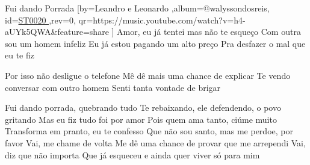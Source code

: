 \beginsong
{Fui dando Porrada %
}[by={Leandro e Leonardo %
},album={@walyssondosreis},
id={\href{https://music.youtube.com/watch?v=h4-aUYk5QWA&feature=share %
}{ST0020 %
}},rev={0}, %
qr={https://music.youtube.com/watch?v=h4-aUYk5QWA&feature=share %
}]
\beginverse 
Amor, eu já tentei mas não te esqueço
Com outra sou um homem infeliz
Eu já estou pagando um alto preço
Pra desfazer o mal que eu te fiz
\endverse

\beginverse 
Por isso não desligue o telefone
Mê dê mais uma chance de explicar
Te vendo conversar com outro homem
Senti tanta vontade de brigar
\endverse

\beginchorus
Fui dando porrada, quebrando tudo
Te rebaixando, ele defendendo, o povo gritando
Mas eu fiz tudo foi por amor
Pois quem ama tanto, ciúme muito
Transforma em pranto, eu te confesso
Que não sou santo, mas me perdoe, por favor
Vai, me chame de volta
Me dê uma chance de provar que me arrependi
Vai, diz que não importa
Que já esqueceu e ainda quer viver só para mim
\endchorus

